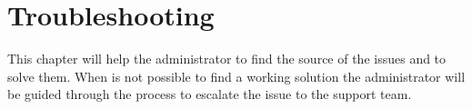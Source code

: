 \chapter{Troubleshooting}

This chapter will help the administrator to find the source of the issues and to solve them. When is not possible to find
a working solution the administrator will be guided through the process to escalate the issue to the support team.




\ifdefined\INTERNALDOC %
    
\fi

